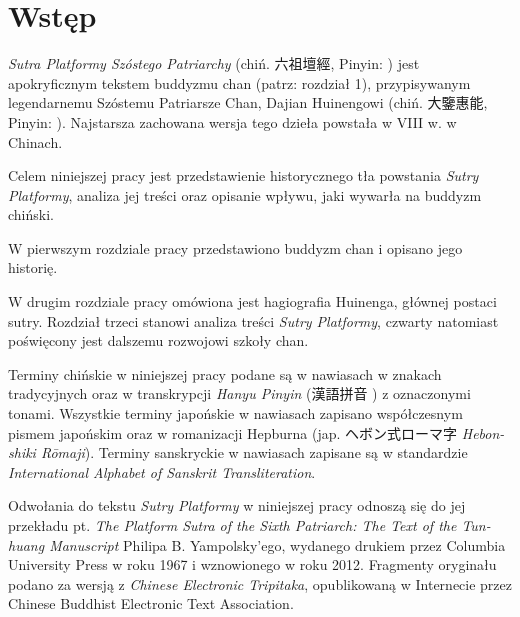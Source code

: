 \chapter*{Wstęp}
\renewcommand{\headrulewidth}{0.3pt}

\textit{Sutra Platformy Szóstego Patriarchy} (chiń. 六祖壇經, Pinyin: ) jest apokryficznym tekstem buddyzmu chan (patrz: rozdział 1), przypisywanym legendarnemu Szóstemu Patriarsze Chan, Dajian Huinengowi (chiń. 大鑒惠能, Pinyin: ). Najstarsza zachowana wersja tego dzieła powstała w VIII w. w Chinach.

Celem niniejszej pracy jest przedstawienie historycznego tła powstania \textit{Sutry Platformy}, analiza jej treści oraz opisanie wpływu, jaki wywarła na buddyzm chiński.

W pierwszym rozdziale pracy przedstawiono buddyzm chan i opisano jego historię.

W drugim rozdziale pracy omówiona jest hagiografia Huinenga, głównej postaci sutry.
Rozdział trzeci stanowi analiza treści \textit{Sutry Platformy}, czwarty natomiast poświęcony jest dalszemu rozwojowi szkoły chan.

Terminy chińskie w niniejszej pracy podane są w nawiasach w znakach tradycyjnych oraz w transkrypcji \textit{Hanyu Pinyin} (漢語拼音 ) z oznaczonymi tonami.
Wszystkie terminy japońskie w nawiasach zapisano współczesnym pismem japońskim oraz w romanizacji Hepburna (jap. {\ipaexgothic ヘボン式ローマ字} \textit{Hebon-shiki Rōmaji}).
Terminy sanskryckie w nawiasach zapisane są w standardzie \textit{International Alphabet of Sanskrit Transliteration}.

Odwołania do tekstu \textit{Sutry Platformy} w niniejszej pracy odnoszą się do jej przekładu pt. \textit{The Platform Sutra of the Sixth Patriarch: The Text of the Tun-huang Manuscript} Philipa B. Yampolsky'ego, wydanego drukiem przez Columbia University Press w roku 1967 i wznowionego w roku 2012.
Fragmenty oryginału podano za wersją z \textit{Chinese Electronic Tripitaka}, opublikowaną w Internecie przez Chinese Buddhist Electronic Text Association.

